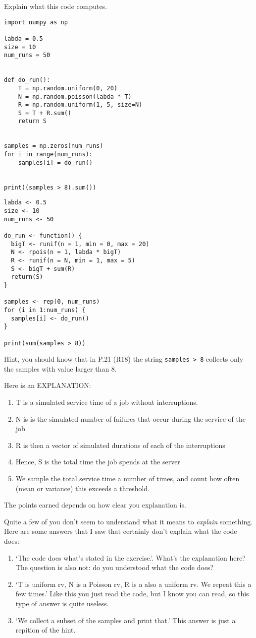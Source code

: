 \begin{exercise}[1.5]
Explain what  this code computes.
  \begin{verbatim}
import numpy as np

labda = 0.5
size = 10
num_runs = 50


def do_run():
    T = np.random.uniform(0, 20)
    N = np.random.poisson(labda * T)
    R = np.random.uniform(1, 5, size=N)
    S = T + R.sum()
    return S


samples = np.zeros(num_runs)
for i in range(num_runs):
    samples[i] = do_run()


print((samples > 8).sum())
  \end{verbatim}

 \begin{verbatim}
labda <- 0.5
size <- 10
num_runs <- 50

do_run <- function() {
  bigT <- runif(n = 1, min = 0, max = 20)
  N <- rpois(n = 1, labda * bigT)
  R <- runif(n = N, min = 1, max = 5)
  S <- bigT + sum(R)
  return(S)
}

samples <- rep(0, num_runs)
for (i in 1:num_runs) {
  samples[i] <- do_run()
}

print(sum(samples > 8))
\end{verbatim}


Hint, you should know that in P.21 (R18) the string \verb|samples > 8| collects only the samples with value larger than 8.


\begin{solution}
Here is an EXPLANATION:
  \begin{enumerate}
  \item T is a simulated service time of a job without interruptions.
  \item N is is the simulated number of failures that occur during the service of the job
  \item R is then a vector of simulated durations of each of the interruptions
  \item Hence, S is the total time the job spends at the server
  \item We sample the total service time a number of times, and count how often (mean or variance) this exceeds a threshold.
  \end{enumerate}
The points earned depends on how clear you explanation is.


Quite a few of you don't seem to understand what it means to \emph{explain} something. Here are some answers that I saw that certainly don't explain what the code does:
  \begin{enumerate}
  \item `The code does what's stated in the exercise.'.
    What's the explanation here?
    The question is also not: do you understood what the code does?
  \item  `T is uniform rv, N is a Poisson rv, R is a also a uniform rv. We repeat this a few times.' Like this you just read the code, but I know you can read, so this type of answer is quite useless.
  \item `We collect  a subset of the samples and print that.' This answer is just a repition of the hint.
  \end{enumerate}


\end{solution}
\end{exercise}
